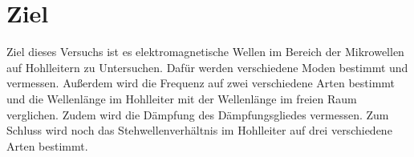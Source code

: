 \section{Ziel}
\label{sec:Ziel}

Ziel dieses Versuchs ist es elektromagnetische Wellen im Bereich der Mikrowellen
auf Hohlleitern zu Untersuchen. Dafür werden verschiedene Moden bestimmt und
vermessen. Außerdem wird die Frequenz auf zwei verschiedene Arten bestimmt und
die Wellenlänge im Hohlleiter mit der Wellenlänge im freien Raum verglichen. Zudem
wird die Dämpfung des Dämpfungsgliedes vermessen. Zum Schluss wird noch das
Stehwellenverhältnis im Hohlleiter auf drei verschiedene Arten bestimmt.
